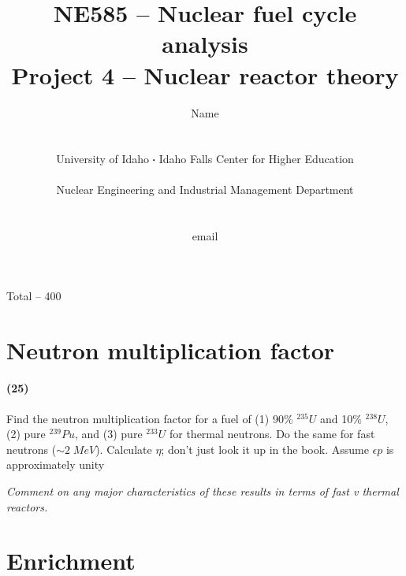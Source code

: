 \documentclass[11pt,a4paper]{article}
\newcommand*\sq{\mathbin{\vcenter{\hbox{\rule{.3ex}{.3ex}}}}} %
\begin{document}
\begin{titlepage}
    \title{
        NE585 -- Nuclear fuel cycle analysis\\
        Project 4 -- Nuclear reactor theory\\
    }
    \author{
        Name
        \\ \\ \\
        University of Idaho $\sq$ Idaho Falls Center for Higher Education
        \\ \\
        Nuclear Engineering and Industrial Management Department
        \\ \\ \\
        email 
    }
\clearpage %
\maketitle
\vspace*{\fill}
\begin{flushright}{
        Total -- 400
}
\end{flushright}
\thispagestyle{empty} %
\end{titlepage}

\printnoidxglossary

\newpage

\section{Neutron multiplication factor}
\paragraph*{(25)}
Find the neutron multiplication factor for a fuel of (1) 90\% $^{235}U$ and 10\% $^{238}U$, (2) pure $^{239}Pu$, and (3) pure $^{233}U$ for thermal neutrons. Do the same for fast neutrons ($\sim 2 \; MeV$). Calculate $\eta$; don't just look it up in the book. Assume $\epsilon p$ is approximately unity 

\vspace{\baselineskip}

\noindent\textit{Comment on any major characteristics of these results in terms of fast v thermal reactors.}





\newpage

\section{Enrichment}
\end{document}
